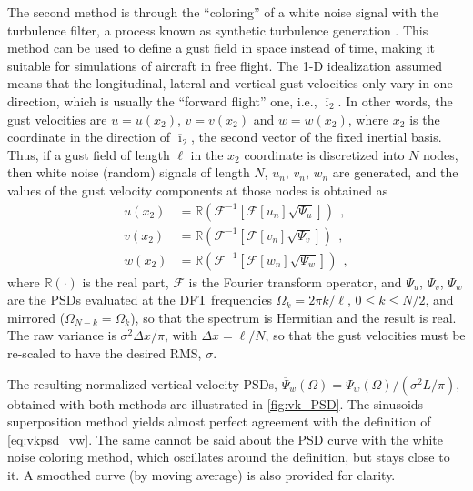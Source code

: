 \documentclass[12pt,a4paper,oneside,english]{abntex2} %
\newcommand{\fix}[1]{{\color{red}#1}}
\newcommand{\uvec}[1]{\overline{#1}}
\def\lb{\left[}
\def\rb{\right]}
\def\lp{\left(}
\def\rp{\right)}
\begin{document}
The second method is through the ``coloring'' of a white noise signal with the turbulence filter, a process known as synthetic turbulence generation \cite{palacios2023dynamics}. This method can be used to define a gust field in space instead of time, making it suitable for simulations of aircraft in free flight. The 1-D idealization assumed means that the longitudinal, lateral and vertical gust velocities only vary in one direction, which is usually the ``forward flight'' one, i.e., $\uvec{\imath}_2$. In other words, the gust velocities are $u=u(x_2)$, $v=v(x_2)$ and $w=w(x_2)$, where $x_2$ is the coordinate in the direction of $\uvec{\imath}_2$, the second vector of the fixed inertial basis. Thus, if a gust field of length $\ell$ in the $x_2$ coordinate is discretized into $N$ nodes, then white noise (random) signals of length $N$, $u_n$, $v_n$, $w_n$ are generated, and the values of the gust velocity components at those nodes is obtained as
\begin{align}
     u(x_2) &= \mathbb{R}\lp\mathcal{F}^{-1}\lb\mathcal{F}[u_n]\sqrt{\Psi_u}\rb\rp \ \ ,
    \label{eq:uvk_whitenoise}
    \\
    v(x_2) &= \mathbb{R}\lp\mathcal{F}^{-1}\lb\mathcal{F}[v_n]\sqrt{\Psi_v}\rb\rp \ \ ,
    \label{eq:vvk_whitenoise}
    \\
    w(x_2) &= \mathbb{R}\lp\mathcal{F}^{-1}\lb\mathcal{F}[w_n]\sqrt{\Psi_w}\rb\rp \ \ ,
    \label{eq:wvk_whitenoise}
\end{align}
where $\mathbb{R}\lp\cdot\rp$ is the real part, $\mathcal{F}$ is the Fourier transform operator, and $\Psi_u$, $\Psi_v$, $\Psi_w$ are the PSDs \fix{evaluated at the DFT frequencies $\Omega_k=2\pi k/\ell$, $0\leq k\leq N/2$, and mirrored ($\Omega_{N-k}=\Omega_k$), so that the spectrum is Hermitian and the result is real. The raw variance is $\sigma^2\Delta x/\pi$, with $\Delta x=\ell/N$, so that the gust velocities must be re-scaled to have the desired RMS, $\sigma$.}

The resulting normalized vertical velocity PSDs, $\overline{\Psi}_w(\Omega)=\Psi_{w}(\Omega)/(\sigma^2L/\pi)$, obtained with both methods are illustrated in \cref{fig:vk_PSD}. The sinusoids superposition method yields almost perfect agreement with the definition of \cref{eq:vkpsd_vw}. The same cannot be said about the PSD curve with the white noise coloring method, which oscillates around the definition, but stays close to it. A smoothed curve (by moving average) is also provided for clarity.
\end{document}

